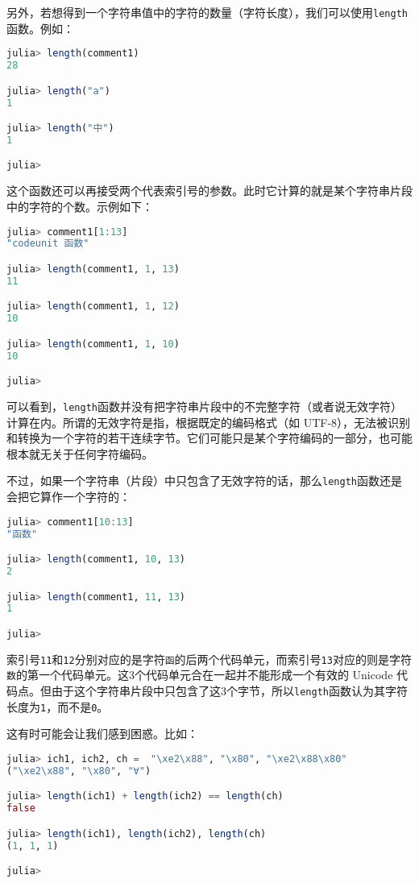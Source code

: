 另外，若想得到一个字符串值中的字符的数量（字符长度），我们可以使用\verb|length|函数。例如：
\begin{lstlisting}[language=julia]
julia> length(comment1)
28

julia> length("a")
1

julia> length("中")
1

julia> 
\end{lstlisting}

这个函数还可以再接受两个代表索引号的参数。此时它计算的就是某个字符串片段中的字符的个数。示例如下：
\begin{lstlisting}[language=julia]
julia> comment1[1:13]
"codeunit 函数"

julia> length(comment1, 1, 13)
11

julia> length(comment1, 1, 12)
10

julia> length(comment1, 1, 10)
10

julia> 
\end{lstlisting}

可以看到，\verb|length|函数并没有把字符串片段中的不完整字符（或者说无效字符）计算在内。所谓的无效字符是指，根据既定的编码格式（如 UTF-8），无法被识别和转换为一个字符的若干连续字节。它们可能只是某个字符编码的一部分，也可能根本就无关于任何字符编码。

不过，如果一个字符串（片段）中只包含了无效字符的话，那么\verb|length|函数还是会把它算作一个字符的：
\begin{lstlisting}[language=julia]
julia> comment1[10:13]
"函数"

julia> length(comment1, 10, 13)
2

julia> length(comment1, 11, 13)
1

julia> 
\end{lstlisting}

索引号\verb|11|和\verb|12|分别对应的是字符\verb|函|的后两个代码单元，而索引号\verb|13|对应的则是字符\verb|数|的第一个代码单元。这3个代码单元合在一起并不能形成一个有效的 Unicode 代码点。但由于这个字符串片段中只包含了这3个字节，所以\verb|length|函数认为其字符长度为\verb|1|，而不是\verb|0|。

这有时可能会让我们感到困惑。比如：
\begin{lstlisting}[language=julia]
julia> ich1, ich2, ch =  "\xe2\x88", "\x80", "\xe2\x88\x80"
("\xe2\x88", "\x80", "∀")

julia> length(ich1) + length(ich2) == length(ch)
false

julia> length(ich1), length(ich2), length(ch)
(1, 1, 1)

julia> 
\end{lstlisting}


